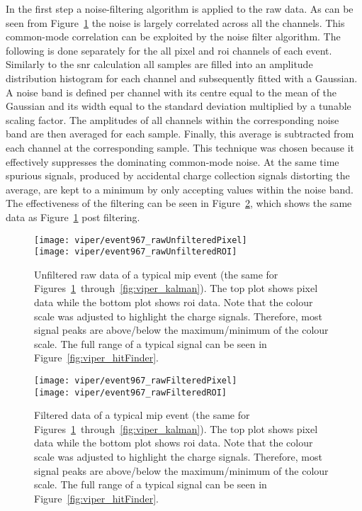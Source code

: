 In the first step a noise-filtering algorithm is applied to the raw data.
As can be seen from Figure~\ref{fig:viper_unfilteredRawData} the noise is largely correlated across all the channels.
This common-mode correlation can be exploited by the noise filter algorithm.
The following is done separately for the all pixel and \gls{roi} channels of each event.
Similarly to the \gls{snr} calculation all samples are filled into an amplitude distribution histogram for each channel and subsequently fitted with a Gaussian.
A noise band is defined per channel with its centre equal to the mean of the Gaussian and its width equal to the standard deviation multiplied by a tunable scaling factor.
The amplitudes of all channels within the corresponding noise band are then averaged for each sample.
Finally, this average is subtracted from each channel at the corresponding sample.
This technique was chosen because it effectively suppresses the dominating common-mode noise.
At the same time spurious signals, produced by accidental charge collection signals distorting the average, are kept to a minimum by only accepting values within the noise band.
The effectiveness of the filtering can be seen in Figure~\ref{fig:viper_filteredRawData}, which shows the same data as Figure~\ref{fig:viper_unfilteredRawData} post filtering.

\begin{figure}[htb]
	\centering
	\texttt{[image: viper/event967\_rawUnfilteredPixel]}\\
	\texttt{[image: viper/event967\_rawUnfilteredROI]}
	\caption[Unfiltered raw data of typical pixel demonstrator event]{%
		Unfiltered raw data of a typical \acrshort{mip} event (the same for Figures~\ref{fig:viper_unfilteredRawData}~through~\ref{fig:viper_kalman}).
		The top plot shows pixel data while the bottom plot shows \acrshort{roi} data.
		Note that the colour scale was adjusted to highlight the charge signals.
		Therefore, most signal peaks are above/below the maximum/minimum of the colour scale.
		The full range of a typical signal can be seen in Figure~\ref{fig:viper_hitFinder}.
	}
	\label{fig:viper_unfilteredRawData}
\end{figure}

\begin{figure}[htb]
	\centering
	\texttt{[image: viper/event967\_rawFilteredPixel]}\\
	\texttt{[image: viper/event967\_rawFilteredROI]}
	\caption[Filtered data of typical pixel demonstrator event]{%
		Filtered data of a typical \acrshort{mip} event (the same for Figures~\ref{fig:viper_unfilteredRawData}~through~\ref{fig:viper_kalman}).
		The top plot shows pixel data while the bottom plot shows \acrshort{roi} data.
		Note that the colour scale was adjusted to highlight the charge signals.
		Therefore, most signal peaks are above/below the maximum/minimum of the colour scale.
		The full range of a typical signal can be seen in Figure~\ref{fig:viper_hitFinder}.
	}
	\label{fig:viper_filteredRawData}
\end{figure}

